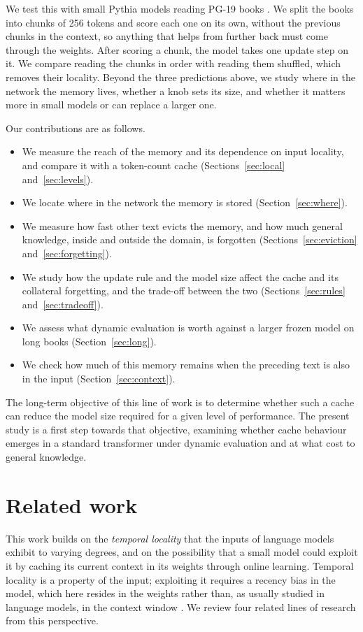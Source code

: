 \documentclass[10pt]{article}
\begin{document}
We test this with small Pythia models \cite{biderman2023pythia} reading PG-19 books \cite{rae2020compressive}.
We split the books into chunks of 256 tokens and score each one on its own, without the previous chunks in the context, so anything that helps from further back must come through the weights.
After scoring a chunk, the model takes one update step on it.
We compare reading the chunks in order with reading them shuffled, which removes their locality.
Beyond the three predictions above, we study where in the network the memory lives, whether a knob sets its size, and whether it matters more in small models or can replace a larger one.

Our contributions are as follows.
\begin{itemize}
\item We measure the reach of the memory and its dependence on input locality, and compare it with a token-count cache (Sections~\ref{sec:local} and~\ref{sec:levels}).
\item We locate where in the network the memory is stored (Section~\ref{sec:where}).
\item We measure how fast other text evicts the memory, and how much general knowledge, inside and outside the domain, is forgotten (Sections~\ref{sec:eviction} and~\ref{sec:forgetting}).
\item We study how the update rule and the model size affect the cache and its collateral forgetting, and the trade-off between the two (Sections~\ref{sec:rules} and~\ref{sec:tradeoff}).
\item We assess what dynamic evaluation is worth against a larger frozen model on long books (Section~\ref{sec:long}).
\item We check how much of this memory remains when the preceding text is also in the input (Section~\ref{sec:context}).
\end{itemize}

The long-term objective of this line of work is to determine whether such a cache can reduce the model size required for a given level of performance.
The present study is a first step towards that objective, examining whether cache behaviour emerges in a standard transformer under dynamic evaluation and at what cost to general knowledge.


\section{Related work}

This work builds on the \emph{temporal locality} that the inputs of language models exhibit to varying degrees, and on the possibility that a small model could exploit it by caching its current context in its weights through online learning.
Temporal locality is a property of the input; exploiting it requires a recency bias in the model, which here resides in the weights rather than, as usually studied in language models, in the context window \cite{zhao2021calibrate}.
We review four related lines of research from this perspective.
\end{document}
